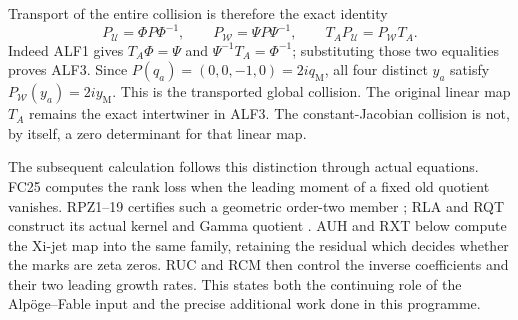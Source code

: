 Transport of the entire collision is therefore the exact identity
\[
 P_{\mathcal U}=\Phi P\Phi^{-1},\qquad
 P_{\mathcal W}=\Psi P\Psi^{-1},\qquad
 T_AP_{\mathcal U}=P_{\mathcal W}T_A.
 \tag{ALF3}
\]
Indeed ALF1 gives $T_A\Phi=\Psi$ and
$\Psi^{-1}T_A=\Phi^{-1}$; substituting those two equalities
proves ALF3. Since $P(q_a)=(0,0,-1,0)=2i q_{\mathrm M}$,
all four distinct $y_a$ satisfy
$P_{\mathcal W}(y_a)=2i y_{\mathrm M}$. This is the transported
global collision. The original linear map $T_A$ remains the exact
intertwiner in ALF3. The constant-Jacobian collision is not, by
itself, a zero determinant for that linear map.

The subsequent calculation follows this distinction through actual
equations. FC25 computes the rank loss when the leading moment of
a fixed old quotient vanishes. RPZ1--19 certifies such a geometric
order-two member \cite{RPZ005}; RLA and RQT construct its actual
kernel and Gamma quotient \cite{RLA008,RQT008}. AUH and RXT below
compute the Xi-jet map into the same family, retaining the residual
which decides whether the marks are zeta zeros. RUC and RCM then
control the inverse coefficients and their two leading growth rates.
This states both the continuing role of the Alp\"oge--Fable input
and the precise additional work done in this programme.
